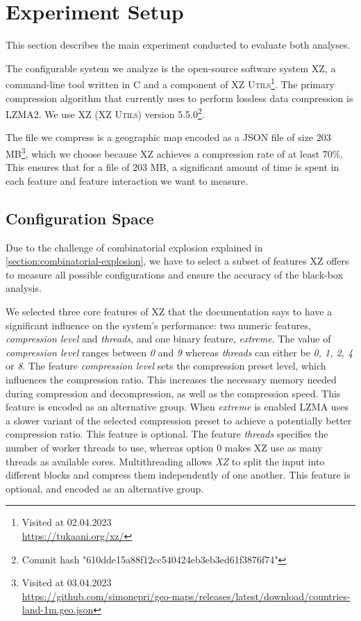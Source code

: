 \section{Experiment Setup}\label{ch:Research-setup}
This section describes the main experiment conducted to evaluate both analyses.

The configurable system we analyze is the open-source software system \textsc{XZ}, a command-line tool written in \textsc{C} and a component of
\textsc{XZ Utils}\footnote{Visited at 02.04.2023\\ \url{https://tukaani.org/xz/}}.  
The primary compression algorithm that  currently uses to perform lossless data compression is LZMA2.
We use \textsc{XZ} \textsc{(XZ Utils)} version 5.5.0\footnote{Commit hash "610dde15a88f12cc540424eb3eb3ed61f3876f74"}.

The file we compress is a geographic map encoded as a \textsc{JSON} file of size 203 MB\footnote{Visited at 03.04.2023\\ \url{https://github.com/simonepri/geo-maps/releases/latest/download/countries-land-1m.geo.json}},
which we choose because \textsc{XZ} achieves a compression rate of at least $70\%$. 
This ensures that for a file of 203 MB, a significant amount of time is spent in each feature and feature interaction we want to measure.

\subsection{Configuration Space}
Due to the challenge of combinatorial explosion explained in \autoref{section:combinatorial-explosion}, 
we have to select a subset of features \textsc{XZ} offers to measure all possible configurations 
and ensure the accuracy of the black-box analysis. 

We selected three core features of \textsc{XZ} that the documentation says to have a significant influence on the system's performance: 
two numeric features, \emph{compression level} and \emph{threads}, and one binary feature, \emph{extreme}. 
The value of \emph{compression level} ranges between \emph{0} and \emph{9} whereas \emph{threads} can either be \emph{0, 1, 2, 4} or \emph{8}. 
The feature \emph{compression level} sets the compression preset level, which influences the compression ratio.
This increases the necessary memory needed during compression and decompression, as well as the compression speed. 
This feature is encoded as an alternative group.
When \emph{extreme} is enabled \textsc{LZMA} uses a slower variant of the selected compression preset to achieve a potentially better compression ratio.
This feature is optional.
The feature \emph{threads} specifies the number of worker threads to use, whereas option $0$ makes \textsc{XZ}  use as many threads as available cores.
Multithreading allows \emph{XZ} to split the input into different blocks and compress them independently of one another.
This feature is optional, and encoded as an alternative group.

